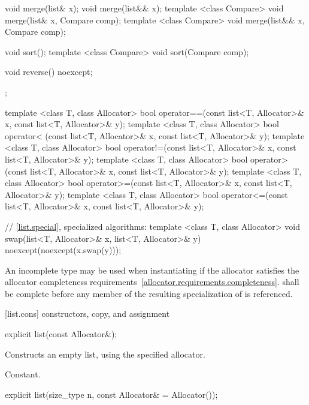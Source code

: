 \begin{codeblock}
{{    void merge(list& x);
    void merge(list&& x);
    template <class Compare> void merge(list& x, Compare comp);
    template <class Compare> void merge(list&& x, Compare comp);

    void sort();
    template <class Compare> void sort(Compare comp);

    void reverse() noexcept;
  };

  template <class T, class Allocator>
    bool operator==(const list<T, Allocator>& x, const list<T, Allocator>& y);
  template <class T, class Allocator>
    bool operator< (const list<T, Allocator>& x, const list<T, Allocator>& y);
  template <class T, class Allocator>
    bool operator!=(const list<T, Allocator>& x, const list<T, Allocator>& y);
  template <class T, class Allocator>
    bool operator> (const list<T, Allocator>& x, const list<T, Allocator>& y);
  template <class T, class Allocator>
    bool operator>=(const list<T, Allocator>& x, const list<T, Allocator>& y);
  template <class T, class Allocator>
    bool operator<=(const list<T, Allocator>& x, const list<T, Allocator>& y);

  // \ref{list.special}, specialized algorithms:
  template <class T, class Allocator>
    void swap(list<T, Allocator>& x, list<T, Allocator>& y)
      noexcept(noexcept(x.swap(y)));
}
\end{codeblock}

\pnum
An incomplete type  may be used when instantiating 
if the allocator satisfies the
allocator completeness requirements~\ref{allocator.requirements.completeness}.
 shall be complete before any member of the resulting specialization
of  is referenced.

[list.cons]{ constructors, copy, and assignment}

%
%
\begin{itemdecl}
explicit list(const Allocator&);
\end{itemdecl}

\begin{itemdescr}
\pnum
\effects
Constructs an empty list, using the specified allocator.

\pnum
\complexity
Constant.
\end{itemdescr}

%
%
\begin{itemdecl}
explicit list(size_type n, const Allocator& = Allocator());
\end{itemdecl}

